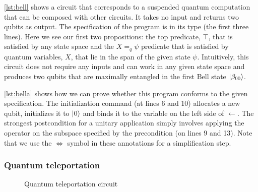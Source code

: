 \documentclass[adraft,creativecommons]{eptcs}
\theoremstyle{definition}
\theoremstyle{remark}
\begin{document}
\cref{lst:bell} shows a circuit that corresponds to a suspended quantum computation that can be composed with other circuits. It takes no input and returns two qubits as output. The specification of the program is in its type (the first three lines). Here we see our first two propositions: the top predicate, $\top$, that is satisfied by any state space and the $X =_q \psi$ predicate that is satisfied by quantum variables, $X$, that lie in the span of the given state $\psi$. Intuitively, this circuit does not require any inputs and can work in any given state space and produces two qubits that are maximally entangled in the first Bell state $\ket{\beta_{00}}$.



\cref{lst:bella} shows how we can prove whether this program conforms to the given specification. The initialization command (at lines 6 and 10) allocates a new qubit, initializes it to $\ket{0}$ and binds it to the variable on the left side of $\leftarrow$. The strongest postcondition for a unitary application simply involves applying the operator on the subspace specified by the precondition (on lines 9 and 13). Note that we use the $\Leftrightarrow$ symbol in these annotations for a simplification step.

\subsubsection{Quantum teleportation}
\label{sec:teleport}

\begin{figure}
    \centering
    \caption{Quantum teleportation circuit}
    \label{fig:teleport}
\end{figure}
\end{document}
